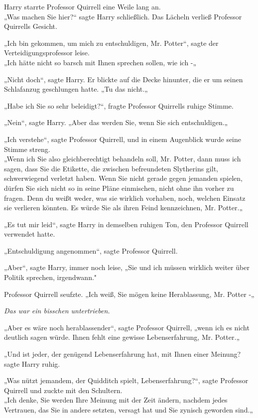 {Harry starrte Professor Quirrell eine Weile lang an.\\ „Was machen Sie hier?“ sagte Harry schließlich. Das Lächeln verließ Professor Quirrells Gesicht.

„Ich bin gekommen, um mich zu entschuldigen, Mr. Potter“, sagte der Verteidigungsprofessor leise.\\ „Ich hätte nicht so barsch mit Ihnen sprechen sollen, wie ich -„

„Nicht doch“, sagte Harry. Er blickte auf die Decke hinunter, die er um seinen Schlafanzug geschlungen hatte. „Tu das nicht.„

„Habe ich Sie so sehr beleidigt?“, fragte Professor Quirrells ruhige Stimme.

„Nein“, sagte Harry. „Aber das werden Sie, wenn Sie sich entschuldigen.„

„Ich verstehe“, sagte Professor Quirrell, und in einem Augenblick wurde seine Stimme streng.\\ „Wenn ich Sie also gleichberechtigt behandeln soll, Mr. Potter, dann muss ich sagen, dass Sie die Etikette, die zwischen befreundeten Slytherins gilt, schwerwiegend verletzt haben. Wenn Sie nicht gerade gegen jemanden spielen, dürfen Sie sich nicht so in seine Pläne einmischen, nicht ohne ihn vorher zu fragen. Denn du weißt weder, was sie wirklich vorhaben, noch, welchen Einsatz sie verlieren könnten. Es würde Sie als ihren Feind kennzeichnen, Mr. Potter.„

„Es tut mir leid“, sagte Harry in demselben ruhigen Ton, den Professor Quirrell verwendet hatte.

„Entschuldigung angenommen“, sagte Professor Quirrell.

„Aber“, sagte Harry, immer noch leise, „Sie und ich müssen wirklich weiter über Politik sprechen, irgendwann."

Professor Quirrell seufzte. „Ich weiß, Sie mögen keine Herablassung, Mr. Potter -„

\emph{Das war ein bisschen untertrieben.}

„Aber es wäre noch herablassender“, sagte Professor Quirrell, „wenn ich es nicht deutlich sagen würde. Ihnen fehlt eine gewisse Lebenserfahrung, Mr. Potter.„

„Und ist jeder, der genügend Lebenserfahrung hat, mit Ihnen einer Meinung? sagte Harry ruhig.

„Was nützt jemandem, der Quidditch spielt, Lebenserfahrung?“, sagte Professor Quirrell und zuckte mit den Schultern.\\ „Ich denke, Sie werden Ihre Meinung mit der Zeit ändern, nachdem jedes Vertrauen, das Sie in andere setzten, versagt hat und Sie zynisch geworden sind.„

}
